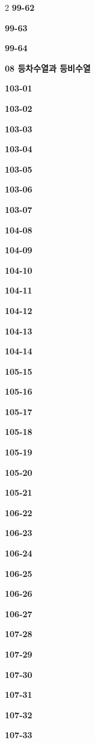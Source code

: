 \documentclass[10pt,a4paper]{article}
\begin{document}
\begin{multicols}{2}
\noindent\textbf{99-62}\ \par
\noindent\textbf{99-63}\ \par
\noindent\textbf{99-64}\ \par
\noindent\textbf{08 등차수열과 등비수열}\par\smallskip
\noindent\textbf{103-01}\ \par
\noindent\textbf{103-02}\ \par
\noindent\textbf{103-03}\ \par
\noindent\textbf{103-04}\ \par
\noindent\textbf{103-05}\ \par
\noindent\textbf{103-06}\ \par
\noindent\textbf{103-07}\ \par
\noindent\textbf{104-08}\ \par
\noindent\textbf{104-09}\ \par
\noindent\textbf{104-10}\ \par
\noindent\textbf{104-11}\ \par
\noindent\textbf{104-12}\ \par
\noindent\textbf{104-13}\ \par
\noindent\textbf{104-14}\ \par
\noindent\textbf{105-15}\ \par
\noindent\textbf{105-16}\ \par
\noindent\textbf{105-17}\ \par
\noindent\textbf{105-18}\ \par
\noindent\textbf{105-19}\ \par
\noindent\textbf{105-20}\ \par
\noindent\textbf{105-21}\ \par
\noindent\textbf{106-22}\ \par
\noindent\textbf{106-23}\ \par
\noindent\textbf{106-24}\ \par
\noindent\textbf{106-25}\ \par
\noindent\textbf{106-26}\ \par
\noindent\textbf{106-27}\ \par
\noindent\textbf{107-28}\ \par
\noindent\textbf{107-29}\ \par
\noindent\textbf{107-30}\ \par
\noindent\textbf{107-31}\ \par
\noindent\textbf{107-32}\ \par
\noindent\textbf{107-33}\ \par

\end{multicols}
\end{document}
